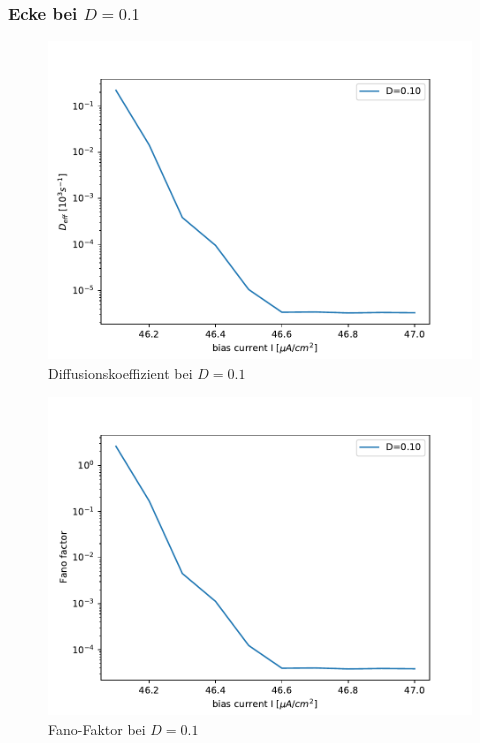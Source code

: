 \documentclass[12pt,a4paper]{article}
\begin{document}
\subsubsection{Ecke bei $D=0.1$}
\begin{figure}[H]
	\centering
	\includegraphics[scale=1]{dneurrealanhopf21flogcornerrealanhopf19flog.pdf}\caption{Diffusionskoeffizient bei $D=0.1$}
	\label{deffanhopfcorner}
\end{figure}
\begin{figure}[H]
	\centering
	\includegraphics[scale=1]{fneurrealanhopf21flogcornerrealanhopf19flog.pdf}\caption{Fano-Faktor bei $D=0.1$}
	\label{fanoanhopfcorner}
\end{figure}
\end{document}
